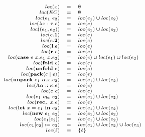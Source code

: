 \documentclass[fleqn]{article}
\begin{document}
\[
\scriptsize
\begin{array}{rcl}
	loc(x) & = & \emptyset \\
	loc(EC) & = & \emptyset \\
	loc(e_1~e_2) & = & loc(e_1) \cup loc(e_2) \\
	loc(\lambda x : \tau. e) & = & loc(e) \\
	loc((e_1,e_2)) & = & loc(e_1) \cup loc(e_2) \\
	loc(e.\mathbf{1}) & = & loc(e) \\
	loc(e.\mathbf{2}) & = & loc(e) \\
	loc(\mathbf{l}.e) & = & loc(e) \\
	loc(\mathbf{r}.e) & = & loc(e) \\
	loc(\mathbf{case}~e~x.e_1~x.e_2) & = & loc(e) \cup loc(e_1) \cup loc(e_2) \\
	loc(\mathbf{fold}~e) & = & loc(e) \\
	loc(\mathbf{unfold}~e) & = & loc(e) \\
	loc(\mathbf{pack} \langle c \mid e \rangle) & = & loc(e) \\
	loc(\mathbf{unpack}~e_1~\alpha.x.e_2) & = & loc(e_1) \cup loc(e_2) \\
	loc(\Lambda \alpha :: \kappa. e) & = & loc(e) \\
	loc(e~c) & = & loc(e) \\
	loc(e_1~o_{bt}~e_2) & = & loc(e_1) \cup loc(e_2) \\
	loc(\mathbf{rec}_{\tau}~x.e) & = & loc(e) \\
	loc(\mathbf{let}~x=e_1~\mathbf{in}~e_2) & = & loc(e_1) \cup loc(e_2) \\
	loc(\mathbf{new}~e_1~e_2) & = & loc(e_1) \cup loc(e_2) \\
	loc(e_1[e_2]) & = & loc(e_1) \cup loc(e_2) \\
	loc(e_1[e_2] := e_3) & = & loc(e_1) \cup loc(e_2) \cup loc(e_3) \\
	loc(\ell) & = & \{ \ell \}
\end{array}
\]
\end{document}

